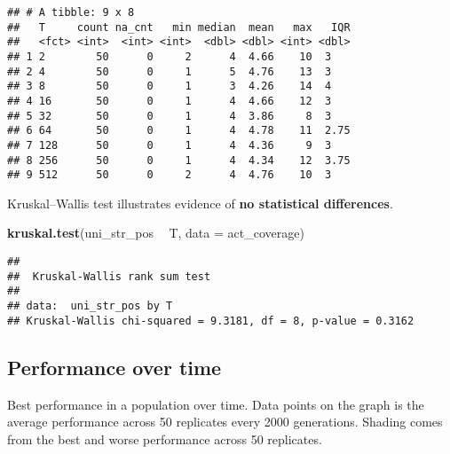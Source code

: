 \documentclass[]{book}
\newenvironment{Shaded}{\begin{snugshade}}{\end{snugshade}}
\newcommand{\DataTypeTok}[1]{\textcolor[rgb]{0.13,0.29,0.53}{#1}}
\newcommand{\KeywordTok}[1]{\textcolor[rgb]{0.13,0.29,0.53}{\textbf{#1}}}
\newcommand{\NormalTok}[1]{#1}
\newcommand{\OperatorTok}[1]{\textcolor[rgb]{0.81,0.36,0.00}{\textbf{#1}}}
\newcommand{\StringTok}[1]{\textcolor[rgb]{0.31,0.60,0.02}{#1}}
\begin{document}
\begin{verbatim}
## # A tibble: 9 x 8
##   T     count na_cnt   min median  mean   max   IQR
##   <fct> <int>  <int> <int>  <dbl> <dbl> <int> <dbl>
## 1 2        50      0     2      4  4.66    10  3   
## 2 4        50      0     1      5  4.76    13  3   
## 3 8        50      0     1      3  4.26    14  4   
## 4 16       50      0     1      4  4.66    12  3   
## 5 32       50      0     1      4  3.86     8  3   
## 6 64       50      0     1      4  4.78    11  2.75
## 7 128      50      0     1      4  4.36     9  3   
## 8 256      50      0     1      4  4.34    12  3.75
## 9 512      50      0     2      4  4.76    10  3
\end{verbatim}

Kruskal--Wallis test illustrates evidence of \textbf{no statistical differences}.

\begin{Shaded}
\begin{Highlighting}[]
\KeywordTok{kruskal.test}\NormalTok{(uni_str_pos }\OperatorTok{~}\StringTok{ }\NormalTok{T, }\DataTypeTok{data =}\NormalTok{ act_coverage)}
\end{Highlighting}
\end{Shaded}

\begin{verbatim}
## 
##  Kruskal-Wallis rank sum test
## 
## data:  uni_str_pos by T
## Kruskal-Wallis chi-squared = 9.3181, df = 8, p-value = 0.3162
\end{verbatim}

\hypertarget{performance-over-time-5}{%
\subsection{Performance over time}\label{performance-over-time-5}}

Best performance in a population over time.
Data points on the graph is the average performance across 50 replicates every 2000 generations.
Shading comes from the best and worse performance across 50 replicates.

\begin{Shaded}
\end{Shaded}
\end{document}
